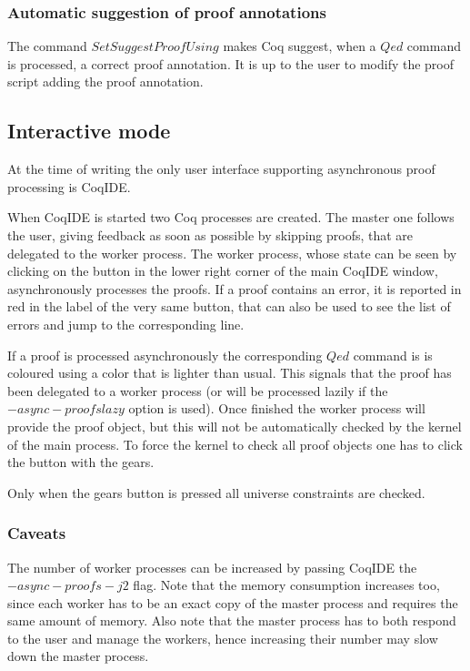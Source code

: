 \subsubsection{Automatic suggestion of proof annotations}

The command $Set Suggest Proof Using$ makes Coq suggest, when a $Qed$
command is processed, a correct proof annotation.  It is up to the user
to modify the proof script adding the proof annotation.

\subsection{Interactive mode}

At the time of writing the only user interface supporting asynchronous proof
processing is CoqIDE.  

When CoqIDE is started two Coq processes are created.  The master one follows
the user, giving feedback as soon as possible by skipping proofs, that are
delegated to the worker process.  The worker process, whose state can be seen
by clicking on the button in the lower right corner of the main CoqIDE window,
asynchronously processes the proofs.  If a proof contains an error, it is
reported in red in the label of the very same button, that can also be used to
see the list of errors and jump to the corresponding line.

If a proof is processed asynchronously the corresponding $Qed$ command is
is coloured using a color that is lighter than usual.  This signals that
the proof has been delegated to a worker process (or will be processed
lazily if the $-async-proofs lazy$ option is used).  Once finished the
worker process will provide the proof object, but this will not be
automatically checked by the kernel of the main process.  To force
the kernel to check all proof objects one has to click the button
with the gears.


Only when the gears button is pressed all universe constraints are checked.

\subsubsection{Caveats}
The number of worker processes can be increased by passing CoqIDE the
$-async-proofs-j 2$ flag.  Note that the memory consumption increases
too, since each worker has to be an exact copy of the master process
and requires the same amount of memory.  Also note that the master process
has to both respond to the user and manage the workers, hence increasing
their number may slow down the master process.

